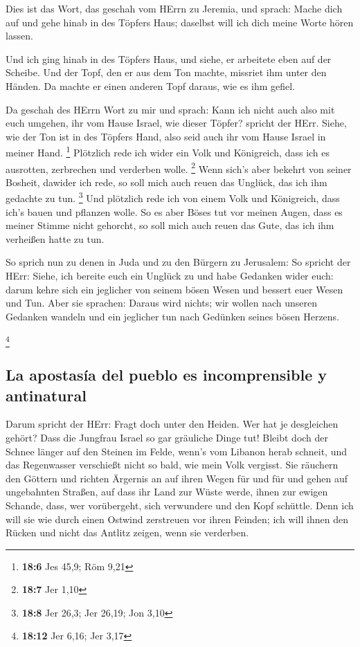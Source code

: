  Dies ist das Wort, das geschah vom HErrn zu Jeremia, und
sprach:  Mache dich auf und gehe hinab in des Töpfers
Haus; daselbst will ich dich meine Worte hören lassen.

 Und ich ging hinab in des Töpfers Haus, und siehe, er
arbeitete eben auf der Scheibe.  Und der Topf, den er aus
dem Ton machte, missriet ihm unter den Händen. Da machte er einen
anderen Topf daraus, wie es ihm gefiel.

 Da geschah des HErrn Wort zu mir und sprach:
 Kann ich nicht auch also mit euch umgehen, ihr vom Hause
Israel, wie dieser Töpfer? spricht der HErr. Siehe, wie der Ton ist in
des Töpfers Hand, also seid auch ihr vom Hause Israel in meiner Hand.
\footnote{\textbf{18:6} Jes 45,9; Röm 9,21}  Plötzlich
rede ich wider ein Volk und Königreich, dass ich es ausrotten,
zerbrechen und verderben wolle. \footnote{\textbf{18:7} Jer 1,10}
 Wenn sich's aber bekehrt von seiner Bosheit, dawider ich
rede, so soll mich auch reuen das Unglück, das ich ihm gedachte zu tun.
\footnote{\textbf{18:8} Jer 26,3; Jer 26,19; Jon 3,10} 
Und plötzlich rede ich von einem Volk und Königreich, dass ich's bauen
und pflanzen wolle.  So es aber Böses tut vor meinen
Augen, dass es meiner Stimme nicht gehorcht, so soll mich auch reuen das
Gute, das ich ihm verheißen hatte zu tun.

 So sprich nun zu denen in Juda und zu den Bürgern zu
Jerusalem: So spricht der HErr: Siehe, ich bereite euch ein Unglück zu
und habe Gedanken wider euch: darum kehre sich ein jeglicher von seinem
bösen Wesen und bessert euer Wesen und Tun.  Aber sie
sprachen: Daraus wird nichts; wir wollen nach unseren Gedanken wandeln
und ein jeglicher tun nach Gedünken seines bösen Herzens.

\footnote{\textbf{18:12} Jer 6,16; Jer 3,17}

\hypertarget{la-apostasuxeda-del-pueblo-es-incomprensible-y-antinatural}{%
\subsection{La apostasía del pueblo es incomprensible y
antinatural}\label{la-apostasuxeda-del-pueblo-es-incomprensible-y-antinatural}}

 Darum spricht der HErr: Fragt doch unter den Heiden. Wer
hat je desgleichen gehört? Dass die Jungfrau Israel so gar gräuliche
Dinge tut!  Bleibt doch der Schnee länger auf den Steinen
im Felde, wenn's vom Libanon herab schneit, und das Regenwasser
verschießt nicht so bald, wie mein Volk vergisst.  Sie
räuchern den Göttern und richten Ärgernis an auf ihren Wegen für und für
und gehen auf ungebahnten Straßen,  auf dass ihr Land zur
Wüste werde, ihnen zur ewigen Schande, dass, wer vorübergeht, sich
verwundere und den Kopf schüttle.  Denn ich will sie wie
durch einen Ostwind zerstreuen vor ihren Feinden; ich will ihnen den
Rücken und nicht das Antlitz zeigen, wenn sie verderben.

